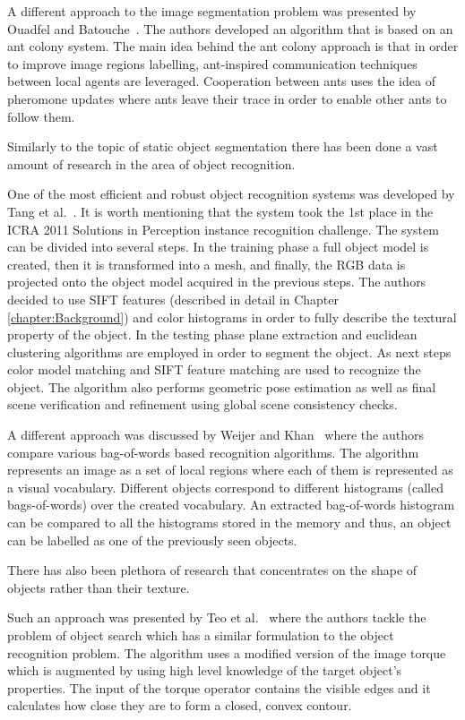 A different approach to the image segmentation problem was presented by Ouadfel and Batouche~\cite{ouadfel2003mrf}. The authors developed an algorithm that is based on an ant colony system. The main idea behind the ant colony approach is that in order to improve image regions labelling, ant-inspired communication techniques between local agents are leveraged. Cooperation between ants uses the idea of pheromone updates where ants leave their trace in order to enable other ants to follow them.  
 
Similarly to the topic of static object segmentation there has been done a vast amount of research in the area of object recognition. 

One of the most efficient and robust object recognition systems was developed by Tang et al.~\cite{tang2012textured}. It is worth mentioning that the system took the 1st place in the ICRA 2011 Solutions in Perception instance recognition challenge. The system can be divided into several steps. In the training phase a full object model is created, then it is transformed into a mesh, and finally, the RGB data is projected onto the object model acquired in the previous steps. The authors decided to use SIFT features (described in detail in Chapter \ref{chapter:Background}) and color histograms in order to fully describe the textural property of the object. In the testing phase plane extraction and euclidean clustering algorithms are employed in order to segment the object. As next steps color model matching and SIFT feature matching are used to recognize the object. The algorithm also performs geometric pose estimation as well as final scene verification and refinement using global scene consistency checks. 

A different approach was discussed by Weijer and Khan~\cite{van2013fusing} where the authors compare various bag-of-words based recognition algorithms. The algorithm represents an image as a set of local regions where each of them is represented as a visual vocabulary. Different objects correspond to different histograms (called bags-of-words) over the created vocabulary. An extracted bag-of-words histogram can be compared to all the histograms stored in the memory and thus, an object can be labelled as one of the previously seen objects. 

There has also been plethora of research that concentrates on the shape of objects rather than their texture. 

Such an approach was presented by Teo et al.~\cite{teoembedding} where the authors tackle the problem of object search which has a similar formulation to the object recognition problem. The algorithm uses a modified version of the image torque~\cite{nishigaki2012image} which is augmented by using high level knowledge of the target object's properties. The input of the torque operator contains the visible edges and it calculates how close they are to form a closed, convex contour.

